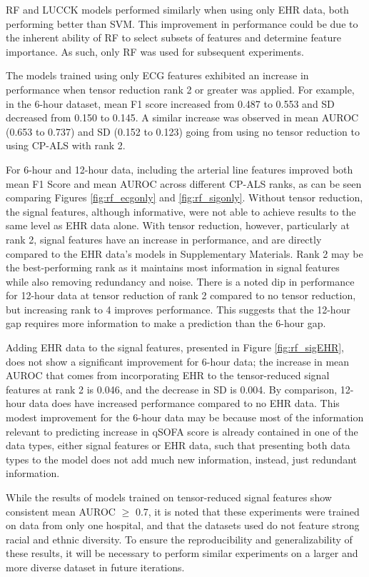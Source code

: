 
RF and LUCCK models performed similarly when using only EHR data, both performing better than SVM. This improvement in performance could be due to the inherent ability of RF to select subsets of features and determine feature importance. As such, only RF was used for subsequent experiments.

The models trained using only ECG features exhibited an increase in performance when tensor reduction rank 2 or greater was applied. For example, in the 6-hour dataset, mean F1 score increased from 0.487 to 0.553 and SD decreased from 0.150 to 0.145. A similar increase was observed in mean AUROC (0.653 to 0.737) and SD (0.152 to 0.123) going from using no tensor reduction to using CP-ALS with rank 2.

For 6-hour and 12-hour data, including the arterial line features improved both mean F1 Score and mean AUROC across different CP-ALS ranks, as can be seen comparing Figures \ref{fig:rf_ecgonly} and \ref{fig:rf_sigonly}.  Without tensor reduction, the signal features, although informative, were not able to achieve results to the same level as EHR data alone. With tensor reduction, however, particularly at rank 2, signal features have an increase in performance, and are directly compared to the EHR data's models in Supplementary Materials. Rank 2 may be the best-performing rank as it maintains most information in signal features while also removing redundancy and noise. There is a noted dip in performance for 12-hour data at tensor reduction of rank 2 compared to no tensor reduction, but increasing rank to 4 improves performance. This suggests that the 12-hour gap requires more information to make a prediction than the 6-hour gap.

Adding EHR data to the signal features, presented in Figure \ref{fig:rf_sigEHR}, does not show a significant improvement for 6-hour data; the increase in mean AUROC that comes from incorporating EHR to the tensor-reduced signal features at rank 2 is 0.046, and the decrease in SD is 0.004. By comparison, 12-hour data does have increased performance compared to no EHR data. This modest improvement for the 6-hour data may be because most of the information relevant to predicting increase in qSOFA score is already contained in one of the data types, either signal features or EHR data, such that presenting both data types to the model does not add much new information, instead, just redundant information.

While the results of models trained on tensor-reduced signal features show consistent mean AUROC $\geq$ 0.7, it is noted that these experiments were trained on data from only one hospital, and that the datasets used do not feature strong racial and ethnic diversity. To ensure the reproducibility and generalizability of these results, it will be necessary to perform similar experiments on a larger and more diverse dataset in future iterations.

